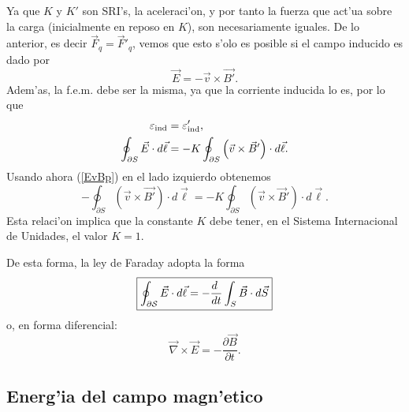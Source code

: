  Ya que $K$ y $K'$ son SRI's, la aceleraci'on, y por tanto la fuerza que act'ua sobre la carga (inicialmente en reposo en $K$), son necesariamente iguales. De lo anterior, es decir $\vec{F}_q=\vec{F}'_q$, vemos que esto s'olo es posible si el campo inducido es dado por
 \begin{equation}\label{EvBp}
\vec{E}=-\vec{v}\times\vec{B'}.
\end{equation}
Adem'as, la f.e.m. debe ser la misma, ya que la corriente inducida lo es, por lo que
\begin{align}
\varepsilon_{\rm ind} &= \varepsilon'_{\rm ind}, \\
\oint_{\partial S}\vec{E}\cdot d\vec{\ell} &=-K\oint_{\partial S}\left(\vec{v}\times\vec{B}'\right)\cdot d\vec{\ell}.
\end{align}
Usando ahora (\ref{EvBp}) en el lado izquierdo obtenemos
\begin{equation}
-\oint_{\partial S}\left(\vec{v}\times\vec{B'}\right)\cdot d\vec{\ell} =-K\oint_{\partial S}\left(\vec{v}\times\vec{B}'\right)\cdot d\vec{\ell}.
\end{equation}
Esta relaci'on implica que la constante $K$ debe tener, en el Sistema Internacional de Unidades, el valor $K=1$. 

De esta forma, la ley de Faraday adopta la forma
\begin{equation}
\boxed{\oint_{\cal\partial S}\vec{E}\cdot d\vec{\ell}=-\frac{d\ }{dt}\int_S\vec{B}\cdot
d\vec{S}}
\end{equation}
o, en forma diferencial:
\begin{equation}
\boxed{\vec\nabla\times\vec{E}=-\frac{\partial\vec{B}}{\partial t}.}
\label{ley-faraday}
\end{equation}



\subsection{Energ'ia del campo magn'etico}


